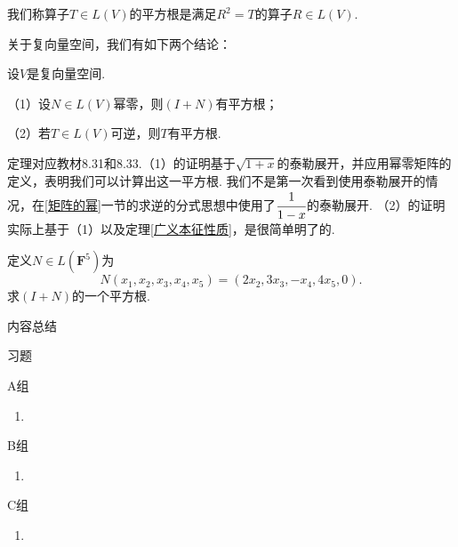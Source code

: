 \begin{definition}
	我们称算子$T\in L(V)$的平方根是满足$R^2=T$的算子$R\in L(V)$.
\end{definition}
关于复向量空间，我们有如下两个结论：
\begin{theorem}\label{幂零平方根}
	设$V$是复向量空间.

	\textup{（1）}设$N\in L(V)$幂零，则$(I+N)$有平方根；

	\textup{（2）}若$T\in L(V)$可逆，则$T$有平方根.
\end{theorem}
定理对应教材8.31和8.33.（1）的证明基于$\sqrt{1+x}$的泰勒展开，并应用幂零矩阵的定义，表明我们可以计算出这一平方根.
我们不是第一次看到使用泰勒展开的情况，在\ref{矩阵的幂}一节的求逆的分式思想中使用了$\cfrac{1}{1-x}$的泰勒展开.
（2）的证明实际上基于（1）以及定理\ref{广义本征性质}，是很简单明了的.
\begin{example}
	定义$N\in L(\mathbf{F}^5)$为
	$$N(x_1,x_2,x_3,x_4,x_5)=(2x_2,3x_3,-x_4,4x_5,0).$$
	求$(I+N)$的一个平方根.
\end{example}

\vspace{2ex} 
\centerline{\heiti \Large 内容总结}

\vspace{2ex} 

\centerline{\heiti \Large 习题}
\vspace{2ex} 
{\kaishu }
\begin{flushright}
    \kaishu

\end{flushright}
\centerline{\heiti A组}
\begin{enumerate}
	\item 
\end{enumerate}
\centerline{\heiti B组}
\begin{enumerate}
	\item 
\end{enumerate}
\centerline{\heiti C组}
\begin{enumerate}
	\item 
\end{enumerate}